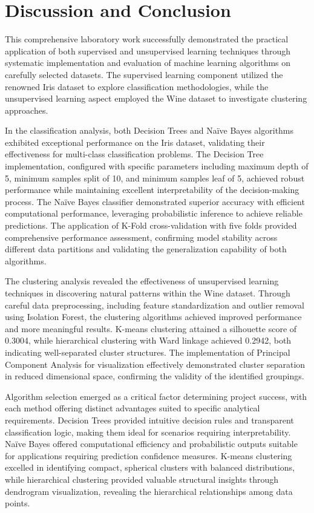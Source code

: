 \documentclass[12pt,a4paper]{article}
\begin{document}

\section{Discussion and Conclusion}

This comprehensive laboratory work successfully demonstrated the practical application of both supervised and unsupervised learning techniques through systematic implementation and evaluation of machine learning algorithms on carefully selected datasets. The supervised learning component utilized the renowned Iris dataset to explore classification methodologies, while the unsupervised learning aspect employed the Wine dataset to investigate clustering approaches.

In the classification analysis, both Decision Trees and Na\"{i}ve Bayes algorithms exhibited exceptional performance on the Iris dataset, validating their effectiveness for multi-class classification problems. The Decision Tree implementation, configured with specific parameters including maximum depth of 5, minimum samples split of 10, and minimum samples leaf of 5, achieved robust performance while maintaining excellent interpretability of the decision-making process. The Na\"{i}ve Bayes classifier demonstrated superior accuracy with efficient computational performance, leveraging probabilistic inference to achieve reliable predictions. The application of K-Fold cross-validation with five folds provided comprehensive performance assessment, confirming model stability across different data partitions and validating the generalization capability of both algorithms.

The clustering analysis revealed the effectiveness of unsupervised learning techniques in discovering natural patterns within the Wine dataset. Through careful data preprocessing, including feature standardization and outlier removal using Isolation Forest, the clustering algorithms achieved improved performance and more meaningful results. K-means clustering attained a silhouette score of 0.3004, while hierarchical clustering with Ward linkage achieved 0.2942, both indicating well-separated cluster structures. The implementation of Principal Component Analysis for visualization effectively demonstrated cluster separation in reduced dimensional space, confirming the validity of the identified groupings.

Algorithm selection emerged as a critical factor determining project success, with each method offering distinct advantages suited to specific analytical requirements. Decision Trees provided intuitive decision rules and transparent classification logic, making them ideal for scenarios requiring interpretability. Na\"{i}ve Bayes offered computational efficiency and probabilistic outputs suitable for applications requiring prediction confidence measures. K-means clustering excelled in identifying compact, spherical clusters with balanced distributions, while hierarchical clustering provided valuable structural insights through dendrogram visualization, revealing the hierarchical relationships among data points.
\end{document}
